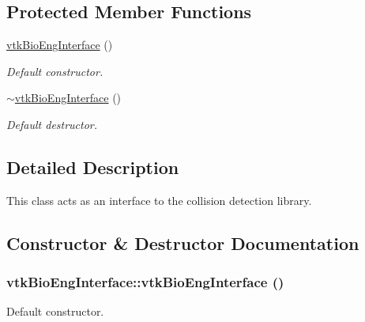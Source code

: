 \subsection*{Protected Member Functions}
\begin{DoxyCompactItemize}
\item 
\hyperlink{classvtkBioEngInterface_a99709eb5036d8015bb14ecf3a40c8374}{vtkBioEngInterface} ()
\begin{DoxyCompactList}\small\item\em Default constructor. \item\end{DoxyCompactList}\item 
\hypertarget{classvtkBioEngInterface_ac707a179d980d5c5f55786c35549c517}{
\hyperlink{classvtkBioEngInterface_ac707a179d980d5c5f55786c35549c517}{$\sim$vtkBioEngInterface} ()}
\label{classvtkBioEngInterface_ac707a179d980d5c5f55786c35549c517}

\begin{DoxyCompactList}\small\item\em Default destructor. \item\end{DoxyCompactList}\end{DoxyCompactItemize}


\subsection{Detailed Description}
This class acts as an interface to the collision detection library. 

\subsection{Constructor \& Destructor Documentation}
\hypertarget{classvtkBioEngInterface_a99709eb5036d8015bb14ecf3a40c8374}{
\subsubsection[{vtkBioEngInterface}]{\setlength{\rightskip}{0pt plus 5cm}vtkBioEngInterface::vtkBioEngInterface ()}}
\label{classvtkBioEngInterface_a99709eb5036d8015bb14ecf3a40c8374}


Default constructor. 

